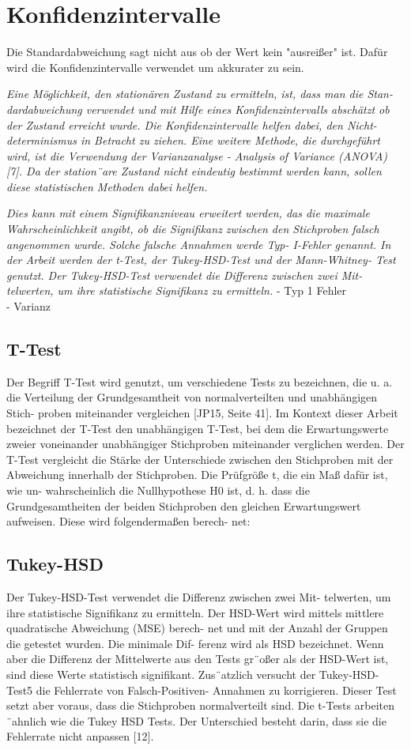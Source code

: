 \section{Konfidenzintervalle}
Die Standardabweichung sagt nicht aus ob der Wert kein "ausreißer" ist. Dafür wird die Konfidenzintervalle verwendet
um akkurater zu sein.

\textit{Eine Möglichkeit, den stationären Zustand zu ermitteln, ist, dass man die Stan-
dardabweichung verwendet und mit Hilfe eines Konfidenzintervalls abschätzt ob
der Zustand erreicht wurde. Die Konfidenzintervalle helfen dabei, den Nicht-
determinismus in Betracht zu ziehen. Eine weitere Methode, die durchgeführt
wird, ist die Verwendung der Varianzanalyse - Analysis of Variance (ANOVA)
[7]. Da der station¨are Zustand nicht eindeutig bestimmt werden kann, sollen
diese statistischen Methoden dabei helfen.}

\textit{Dies kann mit einem Signifikanzniveau erweitert werden,
das die maximale Wahrscheinlichkeit angibt, ob die Signifikanz zwischen den
Stichproben falsch angenommen wurde. Solche falsche Annahmen werde Typ-
I-Fehler genannt.
In der Arbeit werden der t-Test, der Tukey-HSD-Test und der Mann-Whitney-
Test genutzt. Der Tukey-HSD-Test verwendet die Differenz zwischen zwei Mit-
telwerten, um ihre statistische Signifikanz zu ermitteln.}
- Typ 1 Fehler \\
- Varianz
\subsection{T-Test}
Der Begriff T-Test wird genutzt, um verschiedene Tests zu bezeichnen, die
u. a. die Verteilung der Grundgesamtheit von normalverteilten und unabhängigen Stich-
proben miteinander vergleichen [JP15, Seite 41]. Im Kontext dieser Arbeit bezeichnet
der T-Test den unabhängigen T-Test, bei dem die Erwartungswerte zweier voneinander
unabhängiger Stichproben miteinander verglichen werden.
Der T-Test vergleicht die Stärke der Unterschiede zwischen den Stichproben mit der
Abweichung innerhalb der Stichproben. Die Prüfgröße t, die ein Maß dafür ist, wie un-
wahrscheinlich die Nullhypothese H0 ist, d. h. dass die Grundgesamtheiten der beiden
Stichproben den gleichen Erwartungswert aufweisen. Diese wird folgendermaßen berech-
net:
\subsection{Tukey-HSD}
Der Tukey-HSD-Test verwendet die Differenz zwischen zwei Mit-
telwerten, um ihre statistische Signifikanz zu ermitteln.
Der HSD-Wert wird mittels mittlere quadratische Abweichung (MSE) berech-
net und mit der Anzahl der Gruppen die getestet wurden. Die minimale Dif-
ferenz wird als HSD bezeichnet. Wenn aber die Differenz der Mittelwerte aus
den Tests gr¨oßer als der HSD-Wert ist, sind diese Werte statistisch signifikant.
Zus¨atzlich versucht der Tukey-HSD-Test5 die Fehlerrate von Falsch-Positiven-
Annahmen zu korrigieren. Dieser Test setzt aber voraus, dass die Stichproben
normalverteilt sind. Die t-Tests arbeiten ¨ahnlich wie die Tukey HSD Tests. Der
Unterschied besteht darin, dass sie die Fehlerrate nicht anpassen [12]. 
